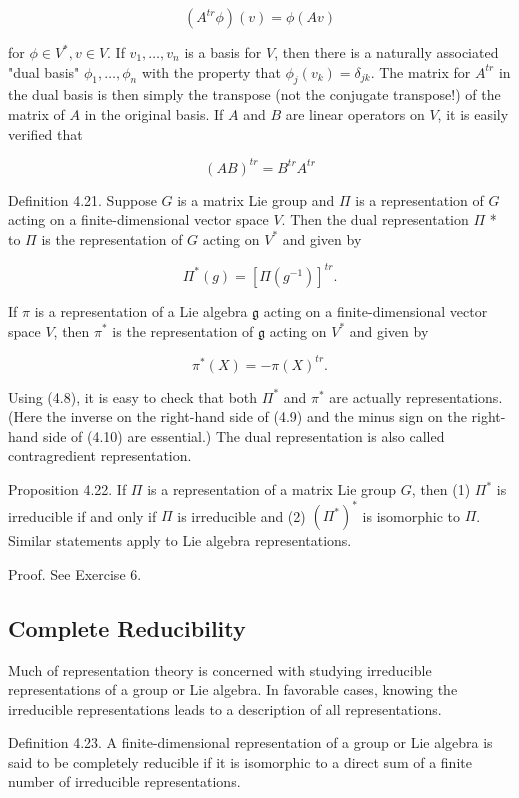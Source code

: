 \documentclass[10pt, letterpaper]{article}
\begin{document}
$$
\left(A^{t r} \phi\right)(v)=\phi(A v)
$$

for $\phi \in V^{*}, v \in V$. If $v_{1}, \ldots, v_{n}$ is a basis for $V$, then there is a naturally associated "dual basis" $\phi_{1}, \ldots, \phi_{n}$ with the property that $\phi_{j}\left(v_{k}\right)=\delta_{j k}$. The matrix for $A^{t r}$ in the dual basis is then simply the transpose (not the conjugate transpose!) of the matrix of $A$ in the original basis. If $A$ and $B$ are linear operators on $V$, it is easily verified that

$$
(A B)^{t r}=B^{t r} A^{t r}
$$

Definition 4.21. Suppose $G$ is a matrix Lie group and $\Pi$ is a representation of $G$ acting on a finite-dimensional vector space $V$. Then the dual representation $\Pi$ * to $\Pi$ is the representation of $G$ acting on $V^{*}$ and given by

$$
\Pi^{*}(g)=\left[\Pi\left(g^{-1}\right)\right]^{t r} .
$$

If $\pi$ is a representation of a Lie algebra $\mathfrak{g}$ acting on a finite-dimensional vector space $V$, then $\pi^{*}$ is the representation of $\mathfrak{g}$ acting on $V^{*}$ and given by

$$
\pi^{*}(X)=-\pi(X)^{t r} .
$$

Using (4.8), it is easy to check that both $\Pi^{*}$ and $\pi^{*}$ are actually representations. (Here the inverse on the right-hand side of (4.9) and the minus sign on the right-hand side of (4.10) are essential.) The dual representation is also called contragredient representation.

Proposition 4.22. If $\Pi$ is a representation of a matrix Lie group $G$, then (1) $\Pi^{*}$ is irreducible if and only if $\Pi$ is irreducible and (2) $\left(\Pi^{*}\right)^{*}$ is isomorphic to $\Pi$. Similar statements apply to Lie algebra representations.

Proof. See Exercise 6.

\subsection*{Complete Reducibility}
Much of representation theory is concerned with studying irreducible representations of a group or Lie algebra. In favorable cases, knowing the irreducible representations leads to a description of all representations.

Definition 4.23. A finite-dimensional representation of a group or Lie algebra is said to be completely reducible if it is isomorphic to a direct sum of a finite number of irreducible representations.
\end{document}
